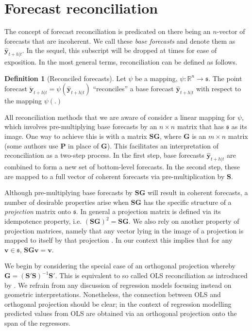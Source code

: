 \documentclass[12pt]{article}
\theoremstyle{definition}
\newtheorem{definition}{Definition}[section]
\begin{document}
\section{Forecast reconciliation}\label{sec:Reconciliation}

The concept of forecast reconciliation is predicated on there being an $n$-vector of forecasts that are incoherent. We call these \emph{base forecasts} and denote them as $\hat{\bm{y}}_{t+h|t}$. In the sequel, this subscript will be dropped at times for ease of exposition. In the most general terms, reconciliation can be defined as follows.

\begin{definition}[Reconciled forecasts]\label{def:reconpoint}
  Let $\psi$ be a mapping, $\psi:\mathbb{R}^n\rightarrow\mathfrak{s}$. The point forecast $\tilde{\bm{y}}_{t+h|t}=\psi(\hat{\bm{y}}_{t+h|t})$ ``reconciles'' a base forecast $\hat{\bm{y}}_{t+h|t}$ with respect to the mapping $\psi(.)$
\end{definition}

All reconciliation methods that we are aware of consider a linear mapping for $\psi$, which involves pre-multiplying base forecasts by an $n\times n$ matrix that has $\mathfrak{s}$ as its image. One way to achieve this is with a matrix $\bm{S}\bm{G}$, where $\bm{G}$ is an $m\times n$ matrix (some authors use $\bm{P}$ in place of $\bm{G}$). This facilitates an interpretation of reconciliation as a two-step process. In the first step, base forecasts $\hat{\bm{y}}_{t+h|t}$ are combined to form a new set of bottom-level forecasts. In the second step, these are mapped to a full vector of coherent forecasts via pre-multiplication by $\bm{S}$.

Although pre-multiplying base forecasts by $\bm{S}\bm{G}$ will result in coherent forecasts, a number of desirable properties arise when $\bm{S}\bm{G}$ has the specific structure of a \emph{projection} matrix onto $\mathfrak{s}$. In general a projection matrix is defined via its idempotence property, i.e. $(\bm{S}\bm{G})^2=\bm{S}\bm{G}$. We also rely on another property of projection matrices, namely that any vector lying in the image of a projection is mapped to itself by that projection \citep[see Lemma 2.4 in][for a proof]{rao1974}. In our context this implies that for any $\bm{v}\in\mathfrak{s}$, $\bm{S}\bm{G}\bm{v}=\bm{v}$.

We begin by considering the special case of an orthogonal projection whereby $\bm{G}=(\bm{S}'\bm{S})^{-1}\bm{S}'$. This is equivalent to so called OLS reconciliation as introduced by \citet{Hyndman2011}. We refrain from any discussion of regression models focusing instead on geometric interpretations. {\color{blue} Nonetheless,} the connection between OLS and orthogonal projection should be clear; in the context of regression modelling predicted values from OLS are obtained via an orthogonal projection onto the span of the regressors.
\end{document}
